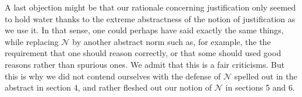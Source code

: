\documentclass[preprint, french, english, 11pt, authoryear]{elsarticle}%
\newcommand{\commentOC}[1]{\textcolor{red}{OC: #1}}
\newcommand{\adv}{\mathscr{N}}
\begin{document}
A last objection might be that our rationale concerning justification only seemed to hold water thanks to the extreme abstractness of the notion of justification as we use it. In that sense, one could perhaps have said exactly the same things, while replacing $\adv$ by another abstract norm such as, for example, the the requirement that one should reason correctly, or that some should used good reasons rather than spurious ones. We admit that this is a fair criticisms. But this is why we did not contend ourselves with the defense of $\adv$ spelled out in the abstract in section 4, and rather fleshed out our notion of $\adv$ in sections 5 and 6.




\end{document}
